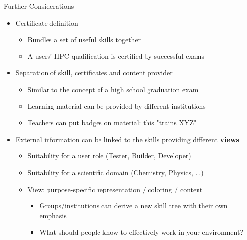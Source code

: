 \documentclass[compress,aspectratio=169]{beamer}
\begin{document}
\begin{frame}{Further Considerations}
	\begin{itemize}
		\item Certificate definition
		\begin{itemize}
			\item Bundles a set of useful skills together %
			\item A users' HPC qualification is certified by successful exams
		\end{itemize}
		\item Separation of skill, certificates and content provider
		\begin{itemize}
			\item Similar to the concept of a high school graduation exam %
			\item Learning material can be provided by different institutions
			\item Teachers can put badges on material: this "trains XYZ"
		\end{itemize}
  	\item External information can be linked to the skills providing different \textbf{views}
		\begin{itemize}
			\item Suitability for a user role (Tester, Builder, Developer)
			\item Suitability for a scientific domain (Chemistry, Physics, ...)
			\item View: purpose-specific representation / coloring / content
				\begin{itemize}
				\item Groups/institutions can derive a new skill tree with their own emphasis
				\item  What should people know to effectively work in your environment?
				\end{itemize}
		\end{itemize}
	\end{itemize}
\end{frame}
\end{document}
